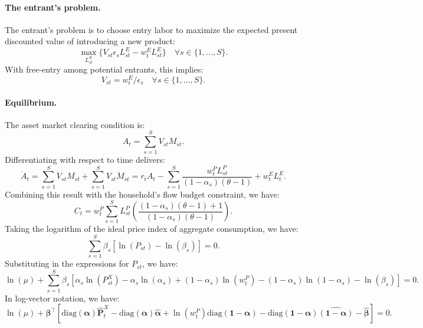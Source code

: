 \documentclass[12pt]{article}
\begin{document}
\paragraph{The entrant's problem.} The entrant's problem is to choose entry labor to maximize the expected present discounted value of introducing a new product:
\begin{equation*}
    \max_{L_{st}^E} \{V_{st} \epsilon_s L_{st}^E - w_t^E L_{st}^E\} \quad \forall s \in \{1, \ldots, S\}.
\end{equation*}
With free-entry among potential entrants, this implies:
\begin{equation*}
    V_{st} = w_t^E / \epsilon_s \quad \forall s \in \{1, \ldots, S\}.
\end{equation*}

\paragraph{Equilibrium.} The asset market clearing condition is:
\begin{equation*}
    A_t = \sum_{s = 1}^S V_{st} M_{st}.
\end{equation*}
Differentiating with respect to time delivers:
\begin{equation*}
    \dot{A}_t = \sum_{s = 1}^S \dot{V}_{st} M_{st} + \sum_{s = 1}^S V_{st} \dot{M}_{st} = r_t A_t - \sum_{s = 1}^S \frac{w_t^P L_{st}^P}{(1 - \alpha_s) (\theta - 1)} + w_t^E L_t^E.
\end{equation*}
Combining this result with the household's flow budget constraint, we have:
\begin{equation*}
    C_t = w_t^P \sum_{s = 1}^S L_{st}^P \left(\frac{(1 - \alpha_s) (\theta - 1) + 1}{(1 - \alpha_s) (\theta - 1)}\right).
\end{equation*}
Taking the logarithm of the ideal price index of aggregate consumption, we have:
\begin{equation*}
    \sum_{s = 1}^S \beta_s [\ln(P_{st}) - \ln(\beta_s)] = 0.
\end{equation*}
Substituting in the expressions for $P_{st}$, we have:
\begin{equation*}
    \ln(\mu) + \sum_{s = 1}^S \beta_s [\alpha_s \ln(P_{st}^X) - \alpha_s \ln(\alpha_s) + (1 - \alpha_s) \ln(w_t^P) - (1 - \alpha_s) \ln(1 - \alpha_s) - \ln(\beta_s)] = 0.
\end{equation*}
In log-vector notation, we have:
\begin{equation*}
    \ln(\mu) + \bm{\beta}^{\top} [\text{diag}(\bm{\alpha}) \hat{\mathbf{P}}_t^X - \text{diag}(\bm{\alpha}) \hat{\bm{\alpha}} + \ln(w_t^P) \text{diag}(\mathbf{1} - \bm{\alpha}) - \text{diag}(\mathbf{1} - \bm{\alpha}) \widehat{(\mathbf{1} - \bm{\alpha})} - \hat{\bm{\beta}}] = 0.
\end{equation*}
\end{document}
